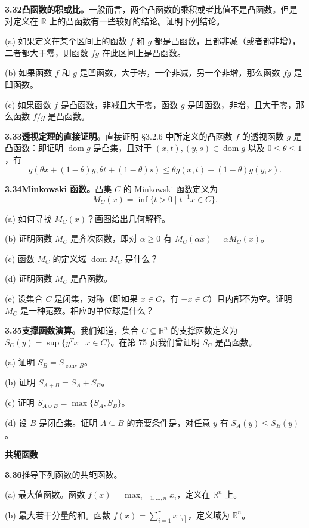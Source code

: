 \documentclass[UTF8, 12pt, fontset=fandol, oneside]{ctexart}
\DeclareMathOperator{\dom}{dom}
\begin{document}
\noindent\textbf{3.32\quad 凸函数的积或比。}\quad 一般而言，两个凸函数的乘积或者比值不是凸函数。但是对定义在 $\mathbb{R}$ 上的凸函数有一些较好的结论。证明下列结论。

(a) 如果定义在某个区间上的函数 $f$ 和 $g$ 都是凸函数，且都非减（或者都非增），二者都大于零，则函数 $fg$ 在此区间上是凸函数。

(b) 如果函数 $f$ 和 $g$ 是凹函数，大于零，一个非减，另一个非增，那么函数 $fg$ 是凹函数。

(c) 如果函数 $f$ 是凸函数，非减且大于零，函数 $g$ 是凹函数，非增，且大于零，那么函数 $f/g$ 是凸函数。

\noindent\textbf{3.33\quad 透视定理的直接证明。}\quad 直接证明 \S3.2.6 中所定义的凸函数 $f$ 的透视函数 $g$ 是凸函数：即证明 $\dom g$ 是凸集，且对于 $(x,t),(y,s)\in\dom g$ 以及 $0\leq\theta\leq1$，有
\[
g(\theta x+(1-\theta)y,\theta t+(1-\theta)s)\leq \theta g(x,t)+(1-\theta)g(y,s).
\]

\noindent\textbf{3.34\quad Minkowski 函数。}\quad 凸集 $C$ 的 Minkowski 函数定义为
\[
M_C(x)=\inf\{t>0\mid t^{-1}x\in C\}.
\]

(a) 如何寻找 $M_C(x)$？画图给出几何解释。

(b) 证明函数 $M_C$ 是齐次函数，即对 $\alpha\geq0$ 有 $M_C(\alpha x)=\alpha M_C(x)$。

(c) 函数 $M_C$ 的定义域 $\dom M_C$ 是什么？

(d) 证明函数 $M_C$ 是凸函数。

(e) 设集合 $C$ 是闭集，对称（即如果 $x\in C$，有 $-x\in C$）且内部不为空。证明 $M_C$ 是一种范数。相应的单位球是什么？

\noindent\textbf{3.35\quad 支撑函数演算。}\quad 我们知道，集合 $C\subseteq\mathbb{R}^n$ 的支撑函数定义为 $S_C(y)=\sup\{y^Tx\mid x\in C\}$。在第 75 页我们曾证明 $S_C$ 是凸函数。

(a) 证明 $S_B=S_{\operatorname{conv}B}$。

(b) 证明 $S_{A+B}=S_A+S_B$。

(c) 证明 $S_{A\cup B}=\max\{S_A,S_B\}$。

(d) 设 $B$ 是闭凸集。证明 $A\subseteq B$ 的充要条件是，对任意 $y$ 有 $S_A(y)\leq S_B(y)$。

\noindent\textbf{共轭函数}

\noindent\textbf{3.36}\quad 推导下列函数的共轭函数。

(a) 最大值函数。函数 $f(x)=\max_{i=1,\ldots,n}x_i$，定义在 $\mathbb{R}^n$ 上。

(b) 最大若干分量的和。函数 $f(x)=\sum_{i=1}^r x_{[i]}$，定义域为 $\mathbb{R}^n$。
\end{document}
